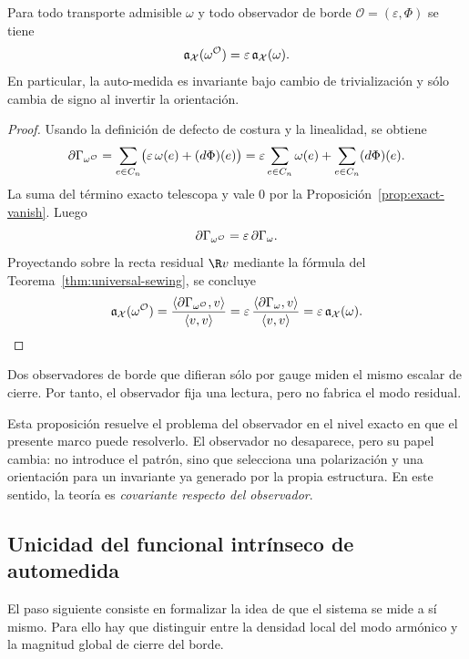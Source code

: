 \begin{proposition}\label{prop:observer-covariance}
Para todo transporte admisible $\omega$ y todo observador de borde
$\mathcal O=(\varepsilon,\Phi)$ se tiene
\[
\mathfrak a_\mathcal X(\omega^{\mathcal O})=\varepsilon\,\mathfrak a_\mathcal X(\omega).
\]
En particular, la auto-medida es invariante bajo cambio de trivialización y sólo cambia de signo al
invertir la orientación.
\end{proposition}

\begin{proof}
Usando la definición de defecto de costura y la linealidad, se obtiene
\[
\partial\Gamma_{\omega^{\mathcal O}}
=
\sum_{e\in C_n}\bigl(\varepsilon\,\omega(e)+(d\Phi)(e)\bigr)
=
\varepsilon\sum_{e\in C_n}\omega(e)+\sum_{e\in C_n}(d\Phi)(e).
\]
La suma del término exacto telescopa y vale $0$ por la
Proposición~\ref{prop:exact-vanish}. Luego
\[
\partial\Gamma_{\omega^{\mathcal O}}=\varepsilon\,\partial\Gamma_\omega.
\]
Proyectando sobre la recta residual $\R v$ mediante la fórmula del
Teorema~\ref{thm:universal-sewing}, se concluye
\[
\mathfrak a_\mathcal X(\omega^{\mathcal O})
=
\frac{\langle \partial\Gamma_{\omega^{\mathcal O}},v\rangle}{\langle v,v\rangle}
=
\varepsilon\,\frac{\langle \partial\Gamma_\omega,v\rangle}{\langle v,v\rangle}
=
\varepsilon\,\mathfrak a_\mathcal X(\omega).
\]
\end{proof}

\begin{corollary}\label{cor:observer-does-not-create}
Dos observadores de borde que difieran sólo por gauge miden el mismo escalar de cierre. Por tanto,
el observador fija una lectura, pero no fabrica el modo residual.
\end{corollary}

\begin{remark}
Esta proposición resuelve el problema del observador en el nivel exacto en que el presente marco
puede resolverlo. El observador no desaparece, pero su papel cambia: no introduce el patrón, sino
que selecciona una polarización y una orientación para un invariante ya generado por la propia
estructura. En este sentido, la teoría es \emph{covariante respecto del observador}.
\end{remark}

\subsection{Unicidad del funcional intrínseco de automedida}

El paso siguiente consiste en formalizar la idea de que el sistema se mide a sí mismo. Para ello hay
que distinguir entre la densidad local del modo armónico y la magnitud global de cierre del borde.

